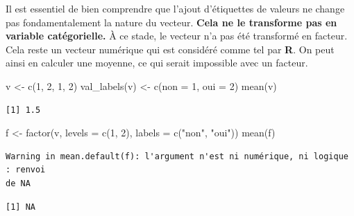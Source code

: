 \documentclass[
  letterpaper,
  DIV=11,
  numbers=noendperiod,
  oneside]{scrreprt}
\newenvironment{Shaded}{\begin{snugshade}}{\end{snugshade}}
\newcommand{\AttributeTok}[1]{\textcolor[rgb]{0.40,0.45,0.13}{#1}}
\newcommand{\DecValTok}[1]{\textcolor[rgb]{0.68,0.00,0.00}{#1}}
\newcommand{\FunctionTok}[1]{\textcolor[rgb]{0.28,0.35,0.67}{#1}}
\newcommand{\NormalTok}[1]{\textcolor[rgb]{0.00,0.23,0.31}{#1}}
\newcommand{\OtherTok}[1]{\textcolor[rgb]{0.00,0.23,0.31}{#1}}
\newcommand{\StringTok}[1]{\textcolor[rgb]{0.13,0.47,0.30}{#1}}
\begin{document}
\begin{tcolorbox}[enhanced jigsaw, colbacktitle=quarto-callout-caution-color!10!white, opacityback=0, toprule=.15mm, colback=white, coltitle=black, bottomtitle=1mm, toptitle=1mm, titlerule=0mm, rightrule=.15mm, title=\textcolor{quarto-callout-caution-color}{\faFire}\hspace{0.5em}{Mise en garde}, breakable, bottomrule=.15mm, opacitybacktitle=0.6, arc=.35mm, left=2mm, leftrule=.75mm, colframe=quarto-callout-caution-color-frame]

Il est essentiel de bien comprendre que l'ajout d'étiquettes de valeurs
ne change pas fondamentalement la nature du vecteur. \textbf{Cela ne le
transforme pas en variable catégorielle.} À ce stade, le vecteur n'a pas
été transformé en facteur. Cela reste un vecteur numérique qui est
considéré comme tel par \textbf{R}. On peut ainsi en calculer une
moyenne, ce qui serait impossible avec un facteur.

\begin{Shaded}
\begin{Highlighting}[]
\NormalTok{v }\OtherTok{\textless{}{-}} \FunctionTok{c}\NormalTok{(}\DecValTok{1}\NormalTok{, }\DecValTok{2}\NormalTok{, }\DecValTok{1}\NormalTok{, }\DecValTok{2}\NormalTok{)}
\FunctionTok{val\_labels}\NormalTok{(v) }\OtherTok{\textless{}{-}} \FunctionTok{c}\NormalTok{(}\AttributeTok{non =} \DecValTok{1}\NormalTok{, }\AttributeTok{oui =} \DecValTok{2}\NormalTok{)}
\FunctionTok{mean}\NormalTok{(v)}
\end{Highlighting}
\end{Shaded}

\begin{verbatim}
[1] 1.5
\end{verbatim}

\begin{Shaded}
\begin{Highlighting}[]
\NormalTok{f }\OtherTok{\textless{}{-}} \FunctionTok{factor}\NormalTok{(v, }\AttributeTok{levels =} \FunctionTok{c}\NormalTok{(}\DecValTok{1}\NormalTok{, }\DecValTok{2}\NormalTok{), }\AttributeTok{labels =} \FunctionTok{c}\NormalTok{(}\StringTok{"non"}\NormalTok{, }\StringTok{"oui"}\NormalTok{))}
\FunctionTok{mean}\NormalTok{(f)}
\end{Highlighting}
\end{Shaded}

\begin{verbatim}
Warning in mean.default(f): l'argument n'est ni numérique, ni logique : renvoi
de NA
\end{verbatim}

\begin{verbatim}
[1] NA
\end{verbatim}

\end{tcolorbox}
\end{document}
